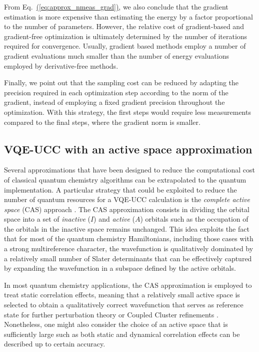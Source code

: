 \documentclass[superscriptaddress,aps,pra,twocolumn,nofootinbib,babel]{revtex4-1}
\newcommand{\eq}[1]{Eq.~\hyperref[eq:#1]{(\ref*{eq:#1})}}
\begin{document}
{From \eq{approx_nmeas_grad}, we also conclude that the gradient estimation is more expensive than estimating the energy by a factor proportional to the number of parameters. However, the relative cost of gradient-based and gradient-free optimization is ultimately determined by the number of iterations required for convergence. Usually, gradient based methods employ a number of gradient evaluations much smaller than the number of energy evaluations employed by derivative-free methods.

Finally, we point out that the sampling cost can be reduced by adapting the precision required in each optimization step according to the norm of the gradient, instead of  employing a fixed gradient precision throughout the optimization. With this strategy, the first steps would require less measurements compared to the final steps, where the gradient norm is smaller.}

\subsection{VQE-UCC with an active space approximation}\label{theory:approximateMethods}

Several approximations that have been designed to reduce the computational cost of classical quantum chemistry algorithms can be extrapolated to the quantum implementation. A particular strategy that could be exploited to reduce the number of quantum resources for a VQE-UCC calculation is the \textit{complete active space} (CAS) approach \cite{Roos.CP.48.157.1980}. The CAS approximation consists in dividing the orbital space into a set of \textit{inactive} ($I$) and \textit{active} ($A$) orbitals such as the occupation of the orbitals in the inactive space remains unchanged. This idea exploits the fact that for most of the quantum chemistry Hamiltonians, including those cases with a strong multireference character, the wavefunction is qualitatively dominated by a relatively small number of Slater determinants that can be effectively captured by expanding the wavefunction in a subspace defined by the active orbitals. 

In most quantum chemistry applications, the CAS approximation is employed to treat static correlation effects, meaning that a relatively small active space is selected to obtain a qualitatively correct wavefunction that serves as reference state for further perturbation theory or Coupled Cluster refinements \cite{Lyakh.CR.112.182.2011,Szalay.CR.112.108.2011}. Nonetheless, one might also consider the choice of an active space that is sufficiently large such as both static and dynamical correlation effects can be described up to certain accuracy.
\end{document}
